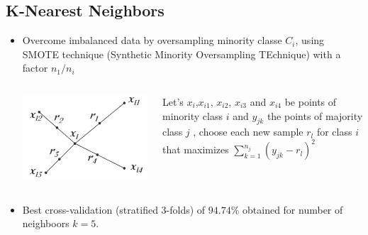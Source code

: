 \documentclass[c]{beamer}
\begin{document}
\subsection{K-Nearest Neighbors}
\begin{frame}
\tableofcontents[currentsubsection]
\end{frame}

\begin{frame}
\begin{itemize}
 \item Overcome imbalanced data by oversampling minority classe $C_{i}$, using SMOTE technique (Synthetic Minority Oversampling TEchnique) with a factor $n_{1}/n_{i}$
      \begin{columns}
      \begin{column}{0.5\textwidth}
      \centering\vfill
      \includegraphics[scale=0.17]{images/oversampling/smote.png}
      \end{column}
      \begin{column}{0.5\textwidth}
      {\tiny
      Let's $x_{i}$,$x_{i1}$, $x_{i2}$, $x_{i3}$ and $x_{i4}$ be points of minority class $i$ and $y_{jk}$ the points of 
      majority class $j$ , choose each new sample $r_{l}$ for class $i$ that maximizes $\sum \limits_{\underset{}{k=1}}^{n_{j}} (y_{jk}-r_{l})^2$
      }
      \end{column}
    \end{columns}
  \item Best cross-validation (stratified 3-folds) of $94.74$\% obtained for number of neighboors $k = 5$. 
 \end{itemize}
\end{frame}
\end{document}
